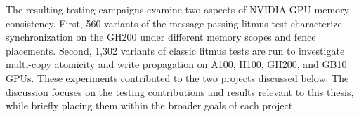 The resulting testing campaigns examine two aspects of NVIDIA GPU memory consistency. First, 560 variants of the message passing litmus test characterize synchronization on the GH200 under different memory scopes and fence placements. Second, 1,302 variants of classic litmus tests are run to investigate multi-copy atomicity and write propagation on A100, H100, GH200, and GB10 GPUs. These experiments contributed to the two projects discussed below. The discussion focuses on the testing contributions and results relevant to this thesis, while briefly placing them within the broader goals of each project.

\begin{table}
    \centering
    \small
\end{table}
